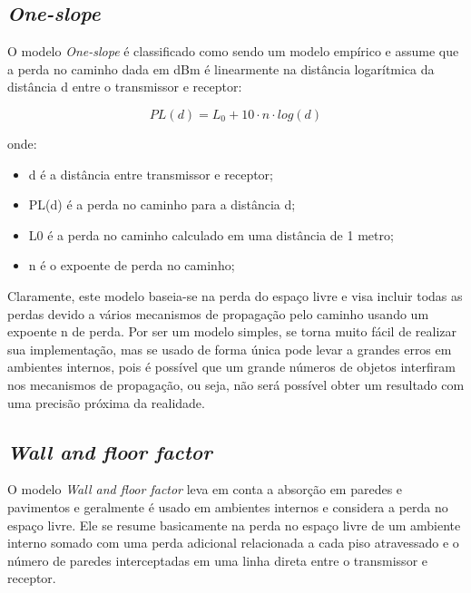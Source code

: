 \documentclass[
	12pt,				%
	openright,			%
	twoside,			%
	a4paper,			%
	english,			%
	french,				%
	spanish,			%
	brazil				%
	]{abntex2}
\begin{document}
\subsection[One-slope]{\textit{One-slope}}

O modelo \textit{One-slope} é classificado como sendo um modelo empírico e assume que a perda no caminho dada em dBm é linearmente na distância logarítmica da distância d entre o transmissor e receptor:


\begin{equation}
PL(d) = L_{0} + 10 \cdot n \cdot log(d)
\end{equation}

onde:

\begin{itemize}
	\item d é a distância entre transmissor e receptor;
	\item PL(d) é a perda no caminho para a distância d;
	\item L0 é a perda no caminho calculado em uma distância de 1 metro;
	\item n é o expoente de perda no caminho;
\end{itemize}

Claramente, este modelo baseia-se na perda do espaço livre e visa incluir todas as perdas devido a vários mecanismos de propagação pelo caminho usando um expoente n de perda. Por ser um modelo simples, se torna muito fácil de realizar sua implementação, mas se usado de forma única pode levar a grandes erros em ambientes internos, pois é possível que um grande números de objetos interfiram nos mecanismos de propagação, ou seja, não será possível obter um resultado com uma precisão próxima da realidade.


\subsection[Wall and floor factor]{\textit{Wall and floor factor}}

O modelo \textit{Wall and floor factor} leva em conta a absorção em paredes e pavimentos e geralmente é usado em ambientes internos e considera a perda no espaço livre. Ele se resume basicamente na perda no espaço livre de um ambiente interno somado com uma perda adicional relacionada a cada piso atravessado e o número de paredes interceptadas em uma linha direta entre o transmissor e receptor.
\end{document}
